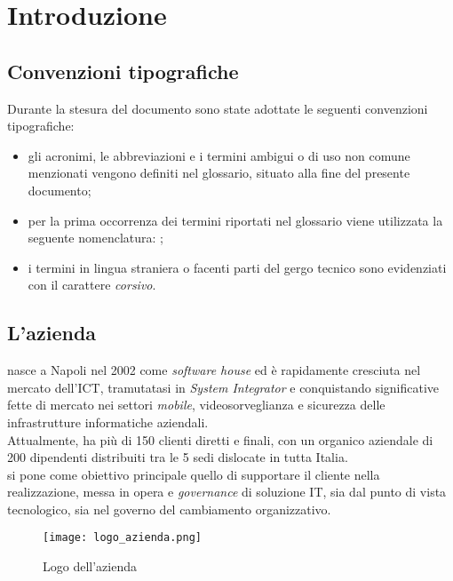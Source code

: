 
\chapter{Introduzione}
\label{cap:introduzione}
\section{Convenzioni tipografiche}
\label{sec:convenzioni tipografiche}
Durante la stesura del documento sono state adottate le seguenti convenzioni
tipografiche:
\begin{itemize}
      \item gli acronimi, le abbreviazioni e i termini ambigui o di uso non
            comune menzionati vengono definiti nel glossario, situato alla fine
            del
            presente documento;
      \item per la prima occorrenza dei termini riportati nel glossario viene
            utilizzata la seguente nomenclatura:
            {\color{RoyalBlue}{parola\glsfirstoccur}};
      \item i termini in lingua straniera o facenti parti del gergo tecnico
            sono evidenziati con il carattere \emph{corsivo}.
\end{itemize}

\section{L'azienda}

\myCompany\xspace nasce a Napoli nel 2002 come \textit{software house} ed è
rapidamente cresciuta nel
mercato dell'\gls{ICT}, tramutatasi in \textit{System Integrator} e
conquistando significative fette di mercato nei settori
\textit{mobile}, videosorveglianza e sicurezza delle infrastrutture
informatiche aziendali. \\
Attualmente, \myCompany ha più di 150 clienti diretti e finali, con un organico
aziendale
di 200 dipendenti distribuiti tra le 5 sedi dislocate in tutta Italia.\\
\myCompany\xspace si pone come obiettivo principale quello di supportare il
cliente nella realizzazione,
messa in opera e \textit{governance} di soluzione IT, sia dal punto di vista
tecnologico,
sia nel governo del cambiamento organizzativo.
\begin{figure}[!h]
      \centering
      \texttt{[image: logo\_azienda.png]}
      \caption{Logo dell'azienda}
\end{figure}

